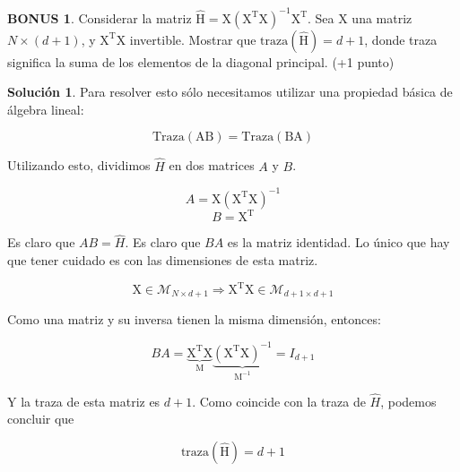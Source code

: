 \documentclass[a4paper, 11pt]{article}
\theoremstyle{definition}
\newtheorem*{solucion}{Solución}
\newtheorem*{bonus}{BONUS}
\begin{document}
  \begin{bonus}
    Considerar la matriz $\hat{\mathrm{H}}=\mathrm{X(X^TX)^{-1}X^T}$. Sea $\mathrm{X}$ una matriz  $N\times (d+1)$, y $\mathrm{X^TX}$ invertible. Mostrar que $\mathrm{traza(\hat{H})}=d+1$, donde traza significa la suma de los elementos de la diagonal principal. (+1 punto)
  \end{bonus}

  \begin{solucion}
    Para resolver esto sólo necesitamos utilizar una propiedad básica de álgebra lineal:

    $$ \mathrm{Traza(AB)}=\mathrm{Traza(BA)}$$

    Utilizando esto, dividimos $\hat{H}$ en dos matrices $A$ y $B$.

    $$A = \mathrm{X(X^TX)^{-1}}$$
    $$B = \mathrm{X^T}$$

    Es claro que $AB=\hat{H}$. Es claro que $BA$ es la matriz identidad. Lo único que hay que tener cuidado es con las dimensiones de esta matriz.

    $$\mathrm{X} \in \mathcal{M}_{N \times d+1} \Rightarrow \mathrm{X^TX} \in \mathcal{M}_{d+1 \times d+1}$$

    Como una matriz y su inversa tienen la misma dimensión, entonces:

    $$BA=\mathrm{\underbrace{X^TX}_M\underbrace{(X^TX)^{-1}}_{M^{-1}}}=I_{d+1}$$

    Y la traza de esta matriz es $d+1$. Como coincide con la traza de $\hat{H}$, podemos concluir que

    $$\mathrm{traza(\hat{H})}=d+1$$
  \end{solucion}
\end{document}
